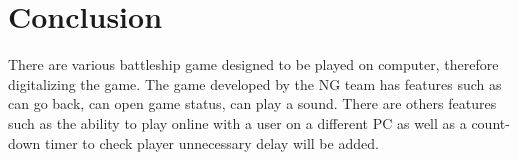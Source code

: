 \documentclass[12pt]{article}
\begin{document}
\section{Conclusion}
There are various battleship game designed to be played on computer, therefore digitalizing the game. The game developed by the NG team has features such as can go back, can open game status, can play a sound. There are others features such as the ability to play online with a user on a different PC as well as a count-down timer to check player unnecessary delay will be added.

\newpage



\clearpage
{}%
\renewcommand*{\thepage}{A\arabic{page}}
\end{document}
